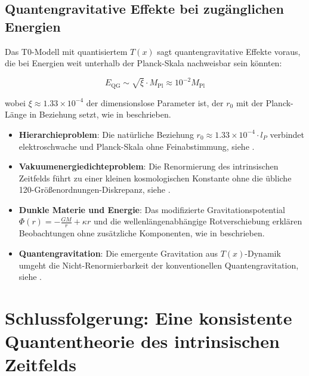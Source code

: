 \documentclass[12pt,a4paper]{article}
\newcommand{\Tfield}{T(x)}
\newcommand{\Mpl}{M_{\text{Pl}}}
\begin{document}
	\subsection{Quantengravitative Effekte bei zugänglichen Energien}
	\label{sec:quantengravitative_effekte}
	
	Das T0-Modell mit quantisiertem $\Tfield$ sagt quantengravitative Effekte voraus, die bei Energien weit unterhalb der Planck-Skala nachweisbar sein könnten:
	
	\begin{equation}
		E_{\text{QG}} \sim \sqrt{\xi} \cdot \Mpl \approx 10^{-2} \Mpl
	\end{equation}
	
	wobei $\xi \approx 1.33 \times 10^{-4}$ der dimensionslose Parameter ist, der $r_0$ mit der Planck-Länge in Beziehung setzt, wie in \cite{pascher_planck_2025} beschrieben.
	
	\begin{tcolorbox}[colback=blue!5!white,colframe=blue!75!black,title=Lösungen für fundamentale Probleme im T0-Modell]
		\begin{itemize}
			\item \textbf{Hierarchieproblem}: Die natürliche Beziehung $r_0 \approx 1.33 \times 10^{-4} \cdot l_P$ verbindet elektroschwache und Planck-Skala ohne Feinabstimmung, siehe \cite{pascher_params_2025}.
			\item \textbf{Vakuumenergiedichteproblem}: Die Renormierung des intrinsischen Zeitfelds führt zu einer kleinen kosmologischen Konstante ohne die übliche 120-Größenordnungen-Diskrepanz, siehe \cite{pascher_temp_2025}.
			\item \textbf{Dunkle Materie und Energie}: Das modifizierte Gravitationspotential $\Phi(r) = -\frac{GM}{r} + \kappa r$ und die wellenlängenabhängige Rotverschiebung erklären Beobachtungen ohne zusätzliche Komponenten, wie in \cite{pascher_energiedynamik_2025} beschrieben.
			\item \textbf{Quantengravitation}: Die emergente Gravitation aus $\Tfield$-Dynamik umgeht die Nicht-Renormierbarkeit der konventionellen Quantengravitation, siehe \cite{pascher_planck_2025}.
		\end{itemize}
	\end{tcolorbox}
	
	\section{Schlussfolgerung: Eine konsistente Quantentheorie des intrinsischen Zeitfelds}
	\label{sec:schlussfolgerung}
	
\end{document}
